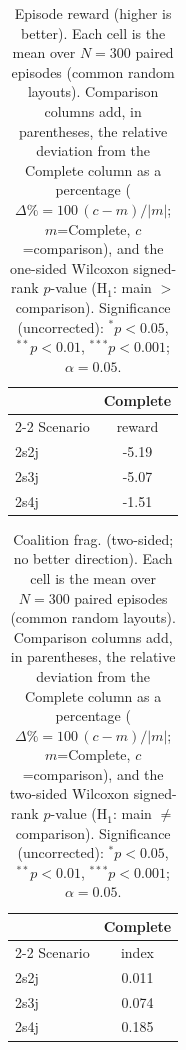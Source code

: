 \begin{table}[ht]
  \centering
  \caption{Episode reward (higher is better). Each cell is the mean over $N=300$ paired episodes (common random layouts). Comparison columns add, in parentheses, the relative deviation from the Complete column as a percentage ($\Delta\%=100\,(c-m)/|m|$; $m$=Complete, $c$=comparison), and the one-sided Wilcoxon signed-rank $p$-value (H$_1$: main $>$ comparison). Significance (uncorrected): $^{*}p<0.05$, $^{**}p<0.01$, $^{***}p<0.001$; $\alpha=0.05$.}
  \label{tab:wilcoxon-reward}
  \small
  \begin{tabular}{l c}
    \toprule
     & Complete \\
    \cmidrule(lr){2-2}
    Scenario & {reward} \\
    \midrule
    2s2j & -5.19 \\
    2s3j & -5.07 \\
    2s4j & -1.51 \\
    \bottomrule
  \end{tabular}
\end{table}

\begin{table}[ht]
  \centering
  \caption{Coalition frag. (two-sided; no better direction). Each cell is the mean over $N=300$ paired episodes (common random layouts). Comparison columns add, in parentheses, the relative deviation from the Complete column as a percentage ($\Delta\%=100\,(c-m)/|m|$; $m$=Complete, $c$=comparison), and the two-sided Wilcoxon signed-rank $p$-value (H$_1$: main $\neq$ comparison). Significance (uncorrected): $^{*}p<0.05$, $^{**}p<0.01$, $^{***}p<0.001$; $\alpha=0.05$.}
  \label{tab:wilcoxon-fragmentation}
  \small
  \begin{tabular}{l c}
    \toprule
     & Complete \\
    \cmidrule(lr){2-2}
    Scenario & {index} \\
    \midrule
    2s2j & 0.011 \\
    2s3j & 0.074 \\
    2s4j & 0.185 \\
    \bottomrule
  \end{tabular}
\end{table}
